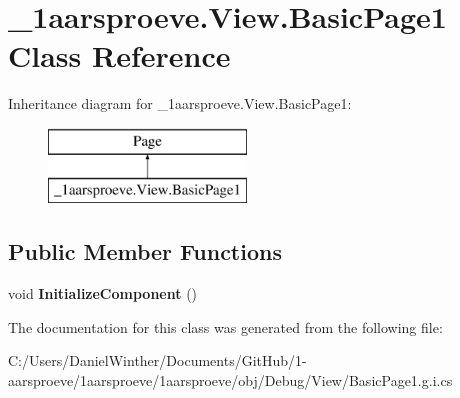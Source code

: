 \hypertarget{class__1aarsproeve_1_1_view_1_1_basic_page1}{}\section{\+\_\+1aarsproeve.\+View.\+Basic\+Page1 Class Reference}
\label{class__1aarsproeve_1_1_view_1_1_basic_page1}
Inheritance diagram for \+\_\+1aarsproeve.\+View.\+Basic\+Page1\+:\begin{figure}[H]
\begin{center}
\leavevmode
\includegraphics[height=2.000000cm]{class__1aarsproeve_1_1_view_1_1_basic_page1}
\end{center}
\end{figure}
\subsection*{Public Member Functions}
\begin{DoxyCompactItemize}
\item 
\hypertarget{class__1aarsproeve_1_1_view_1_1_basic_page1_a3ab3823b20bab45db7e1c30759ad354e}{}void {\bfseries Initialize\+Component} ()\label{class__1aarsproeve_1_1_view_1_1_basic_page1_a3ab3823b20bab45db7e1c30759ad354e}

\end{DoxyCompactItemize}


The documentation for this class was generated from the following file\+:\begin{DoxyCompactItemize}
\item 
C\+:/\+Users/\+Daniel\+Winther/\+Documents/\+Git\+Hub/1-\/aarsproeve/1aarsproeve/1aarsproeve/obj/\+Debug/\+View/Basic\+Page1.\+g.\+i.\+cs\end{DoxyCompactItemize}

